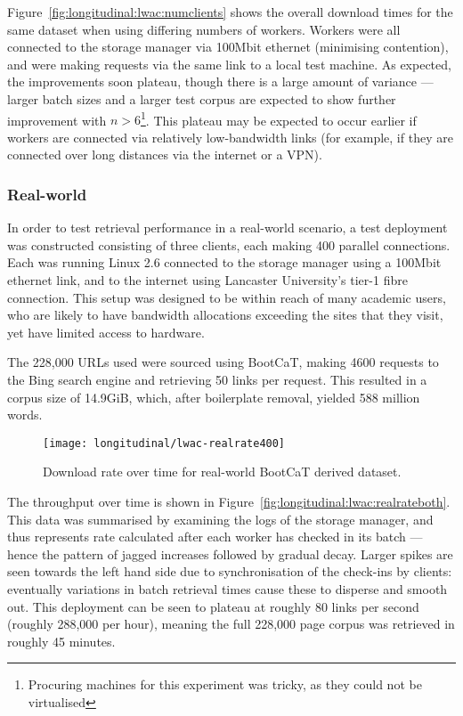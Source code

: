 Figure~\ref{fig:longitudinal:lwac:numclients} shows the overall download times for the same dataset when using differing numbers of workers.  Workers were all connected to the storage manager via 100Mbit ethernet (minimising contention), and were making requests via the same link to a local test machine.  As expected, the improvements soon plateau, though there is a large amount of variance --- larger batch sizes and a larger test corpus are expected to show further improvement with $n > 6$\footnote{Procuring machines for this experiment was tricky, as they could not be virtualised}.  This plateau may be expected to occur earlier if workers are connected via relatively low-bandwidth links (for example, if they are connected over long distances via the internet or a VPN).





\subsubsection{Real-world}

In order to test retrieval performance in a real-world scenario, a test deployment was constructed consisting of three clients, each making 400 parallel connections.  Each was running Linux 2.6 connected to the storage manager using a 100Mbit ethernet link, and to the internet using Lancaster University's tier-1 fibre connection.  This setup was designed to be within reach of many academic users, who are likely to have bandwidth allocations exceeding the sites that they visit, yet have limited access to hardware.


The 228,000 URLs used were sourced using BootCaT, making 4600 requests to the Bing search engine and retrieving 50 links per request.  This resulted in a corpus size of 14.9GiB, which, after boilerplate removal, yielded 588 million words.


\begin{figure}[Ht]
    \centering
    \texttt{[image: longitudinal/lwac-realrate400]}
    \caption{Download rate over time for real-world BootCaT derived dataset.}
    \label{fig:longitudinal:lwac:realrate400}
\end{figure}

The throughput over time is shown in Figure~\ref{fig:longitudinal:lwac:realrateboth}.  This data was summarised by examining the logs of the storage manager, and thus represents rate calculated after each worker has checked in its batch --- hence the pattern of jagged increases followed by gradual decay.  Larger spikes are seen towards the left hand side due to synchronisation of the check-ins by clients: eventually variations in batch retrieval times cause these to disperse and smooth out.  This deployment can be seen to plateau at roughly 80 links per second (roughly 288,000 per hour), meaning the full 228,000 page corpus was retrieved in roughly 45 minutes.

